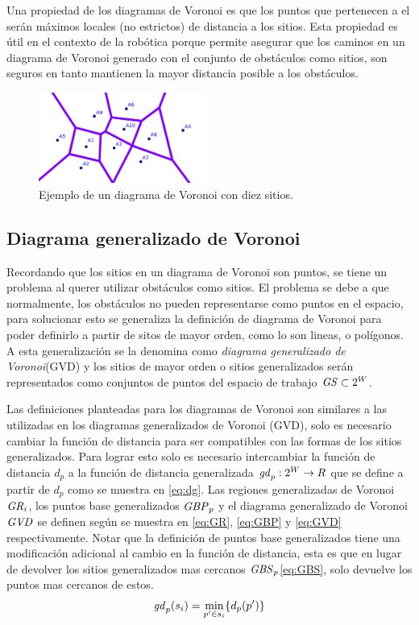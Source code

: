 Una propiedad de los diagramas de Voronoi es que los puntos que pertenecen a el serán máximos locales (no estrictos) de distancia a los sitios. Esta propiedad es útil en el contexto de la robótica porque permite asegurar que los caminos en un diagrama de Voronoi generado con el conjunto de obstáculos como sitios, son seguros en tanto mantienen la mayor distancia posible a los obstáculos.

\begin{figure}[ht]
  \center
  \includegraphics[width=5.5cm]{imagenes/VD.png}
  \caption{Ejemplo de un diagrama de Voronoi con diez sitios.\cite{voronoigeo}}\label{fig:ejemploVoronoi}
\end{figure} 

\subsection{Diagrama generalizado de Voronoi}\cite{choset2005principles}\cite{latombe1991}\cite{wurm2008coordinated}
Recordando que los sitios en un diagrama de Voronoi son puntos, se tiene un problema al querer utilizar obstáculos como sitios. El problema se debe a que normalmente, los obstáculos no pueden representarse como puntos en el espacio, para solucionar esto se generaliza la definición de diagrama de Voronoi para poder definirlo a partir de sitos de mayor orden, como lo son lineas, o polígonos. A esta generalización se la denomina como \emph{diagrama generalizado de Voronoi}(GVD) y los sitios de mayor orden o sitios generalizados serán representados como conjuntos de puntos del espacio de trabajo $\mathit{GS}\subset 2^{W}$.

Las definiciones planteadas para los diagramas de Voronoi son similares a las utilizadas en los diagramas generalizados de Voronoi (GVD), solo es necesario cambiar la función de distancia para ser compatibles con las formas de los sitios generalizados. Para lograr esto solo es necesario intercambiar la función de distancia $d_p$ a la función de distancia generalizada $\mathit{gd}_p : 2^{W} \rightarrow R$ que se define a partir de $d_p$ como se muestra en \ref{eq:dg}. Las regiones generalizadas de Voronoi $\mathit{GR}_i$, los puntos base generalizados $\mathit{GBP}_p$ y el diagrama generalizado de Voronoi $\mathit{GVD}$ se definen según se muestra en \ref{eq:GR}, \ref{eq:GBP} y \ref{eq:GVD} respectivamente. Notar que la definición de puntos base generalizados tiene una modificación adicional al cambio en la función de distancia, esta es que en lugar de devolver los sitios generalizados mas cercanos $\mathit{GBS}_p$\ref{eq:GBS}, solo devuelve los puntos mas cercanos de estos.
\begin{equation}
  \mathit{gd}_p(s_i) = \min_{p'\in s_i}\{d_p(p')\} \label{eq:dg}
\end{equation}


